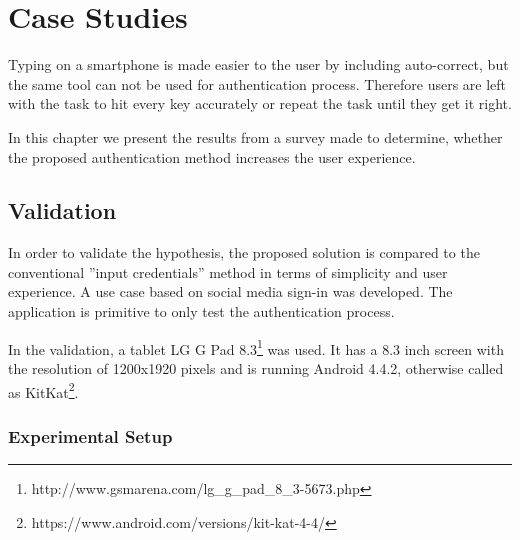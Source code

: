 
\chapter{Case Studies} %


Typing on a smartphone is made easier to the user by including auto-correct, but the same tool can not be used for authentication process. Therefore users are left with the task to hit every key accurately or repeat the task until they get it right. 

In this chapter we present the results from a survey made to determine, whether the proposed authentication method increases the user experience.



\ifpdf
    \graphicspath{{X/figures/PNG/}{X/figures/PDF/}{X/figures/}}
\else
    \graphicspath{{X/figures/EPS/}{X/figures/}}
\fi


\section{Validation}
In order to validate the hypothesis, the proposed solution is compared to the conventional ''input credentials'' method in terms of simplicity and user experience. A use case based on social media sign-in was developed. The application is primitive to only test the authentication process. 

In the validation, a tablet LG G Pad 8.3\footnote[16]{http://www.gsmarena.com/lg\_g\_pad\_8\_3-5673.php} was used. It has a 8.3 inch screen with the resolution of 1200x1920 pixels and is running Android 4.4.2, otherwise called as KitKat\footnote[17]{https://www.android.com/versions/kit-kat-4-4/}.

\subsection{Experimental Setup}
	
